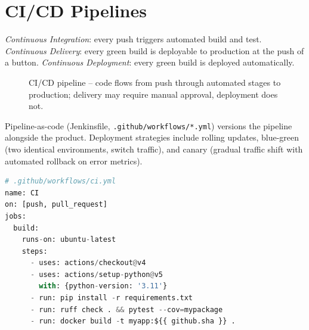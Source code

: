\section{CI/CD Pipelines}

\begin{definition}[CI/CD]
\emph{Continuous Integration}: every push triggers automated build and test. \emph{Continuous Delivery}: every green build is deployable to production at the push of a button. \emph{Continuous Deployment}: every green build is deployed automatically.
\end{definition}

\begin{figure}[h]
\centering
{}
\caption{CI/CD pipeline -- code flows from push through automated stages to production; delivery may require manual approval, deployment does not.}
\end{figure}

Pipeline-as-code (Jenkinsfile, \texttt{.github/workflows/*.yml}) versions the pipeline alongside the product. Deployment strategies include rolling updates, blue-green (two identical environments, switch traffic), and canary (gradual traffic shift with automated rollback on error metrics).

\begin{lstlisting}[language=Python,caption={GitHub Actions CI/CD (simplified).}]
# .github/workflows/ci.yml
name: CI
on: [push, pull_request]
jobs:
  build:
    runs-on: ubuntu-latest
    steps:
      - uses: actions/checkout@v4
      - uses: actions/setup-python@v5
        with: {python-version: '3.11'}
      - run: pip install -r requirements.txt
      - run: ruff check . && pytest --cov=mypackage
      - run: docker build -t myapp:${{ github.sha }} .
\end{lstlisting}

